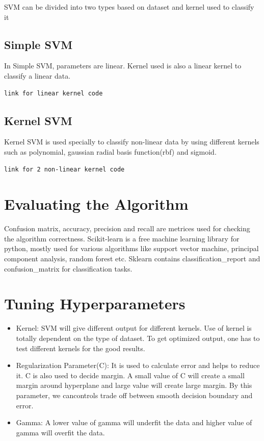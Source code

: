 \documentclass[journal,12pt,twocolumn]{IEEEtran}
\begin{document}
SVM can be divided into two types based on dataset and kernel used to classify it


\subsection{Simple SVM}
In Simple SVM, parameters are linear. Kernel used is also a linear kernel to classify a linear data.

\begin{lstlisting}
link for linear kernel code
\end{lstlisting}

\subsection{Kernel SVM}
Kernel SVM is used specially to classify non-linear data by using different kernels such as polynomial, gaussian radial basis function(rbf) and sigmoid.
 
\begin{lstlisting}[mathescape=true]
link for 2 non-linear kernel code
\end{lstlisting}

\section{Evaluating the Algorithm}
Confusion matrix, accuracy, precision and recall are metrices used for checking the algorithm correctness. Scikit-learn is a free machine learning library for python, mostly used for various algorithms like support vector machine, principal component analysis, random forest etc. Sklearn contains classification\_report and confusion\_matrix for classification tasks.

\section{Tuning Hyperparameters}
\begin{itemize}
\item Kernel: SVM will give different output for different kernels. Use of kernel is totally dependent on the type of dataset. To get optimized output, one has to test different kernels for the good results.\\
	
\item Regularization Parameter(C): It is used to calculate error and helps to reduce it. C is also used to decide margin. A small value of C will create a small margin around hyperplane and large value will create large margin. By this parameter, we cancontrols trade off between smooth decision boundary and error.\\


\item Gamma: A lower value of gamma will underfit the data and higher value of gamma will overfit the data.\\

\end{itemize}
\end{document}
